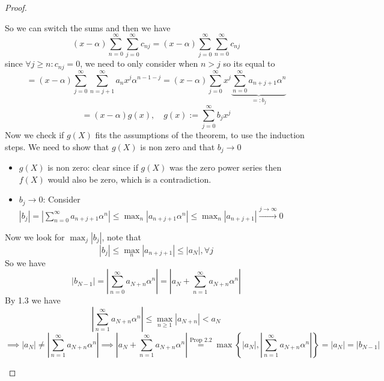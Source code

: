 \documentclass[a4paper]{article}
\theoremstyle{plain}
\theoremstyle{definition}
\begin{document}
\begin{proof}
\begin{itemize}
          So we can switch the sums and then we have
          $$(x-\alpha) \sum_{n=0}^{\infty} \sum_{j=0}^{\infty} c_{nj} = (x-\alpha) \sum_{j=0}^{\infty} \sum_{n=0}^{\infty} c_{nj}$$
          since $\forall j \geq n:c_{nj} = 0$, we need to only consider when $n > j$ so its equal to
          $$= (x-\alpha) \sum_{j=0}^{\infty} \sum_{n=j+1}^{\infty} a_{n}x^{j}\alpha^{n-1-j} = (x-\alpha) \sum_{j=0}^{\infty} x^{j} \underbrace{\sum_{n=0}^{\infty} a_{n+j+1}\alpha^{n}}_{=:b_{j}}$$
          $$= (x-\alpha)g(x),\quad g(x):=\sum_{j=0}^{\infty}b_{j}x^{j}$$
          Now we check if $g(X)$ fits the assumptions of the theorem, to use the induction steps. We need to show that $g(X)$ is non zero and that $b_{j} \to 0$
          \begin{itemize}
            \item $g(X)$ is non zero: clear since if $g(X)$ was the zero power series then $f(X)$ would also be zero, which is a contradiction.
            \item $b_{j} \to 0$: Consider $|b_{j}| = \left|\sum_{n=0}^{\infty}a_{n+j+1}\alpha^{n}\right| \leq \max_{n}|a_{n+j+1}\alpha^{n}| \leq \max_{n}|a_{n+j+1}| \xrightarrow{j \to \infty} 0$
          \end{itemize}
          Now we look for $\max_{j}|b_{j}|$, note that
          $$|b_{j}| \leq \max_{n}|a_{n+j+1}| \leq |a_{N}|, \forall j$$
          So we have
          $$|b_{N-1}| = \left|\sum_{n = 0}^{\infty}a_{N+n}\alpha^{n}\right| = \left| a_{N} + \sum_{n=1}^{\infty}a_{N+n}\alpha^{n}\right|$$
          By 1.3 we have
          $$\left| \sum_{n = 1}^{\infty}a_{N+n}\alpha^{n}\right| \leq \max_{n \geq 1}|a_{N+n}| < a_{N}$$
          $$\implies |a_{N}| \neq \left| \sum_{n = 1}^{\infty}a_{N+n}\alpha^{n}\right| \implies \left| a_{N} + \sum_{n=1}^{\infty}a_{N+n}\alpha^{n}\right| \overset{\text{Prop } 2.2}= \max\left\{|a_{N}|, \left| \sum_{n = 1}^{\infty}a_{N+n}\alpha^{n}\right| \right\} = |a_{N}| = |b_{N-1}|$$

\end{itemize}
\end{proof}
\end{document}
